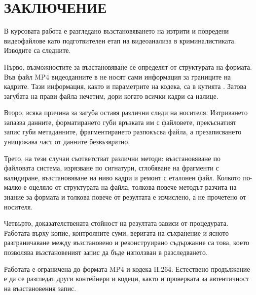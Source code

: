 \section*{ЗАКЛЮЧЕНИЕ}

В курсовата работа е разгледано възстановяването на изтрити и повредени видеофайлове
като подготвителен етап на видеоанализа в криминалистиката. Изводите са следните.

Първо, възможностите за възстановяване се определят от структурата на формата. Във
файл MP4 видеоданните в  не носят сами информация за границите на кадрите. Тази
информация, както и параметрите на кодека, са в кутията . Затова загубата на
 прави файла нечетим, дори когато всички кадри са налице.

Второ, всяка причина за загуба оставя различни следи на носителя. Изтриването запазва
данните, форматирането губи връзката им с файловете, прекъснатият запис губи
метаданните, фрагментирането разпокъсва файла, а презаписването унищожава част от
данните безвъзвратно.

Трето, на тези случаи съответстват различни методи: възстановяване по файловата
система, изрязване по сигнатури, сглобяване на фрагменти с валидиране, възстановяване
на ниво кадри и ремонт с еталонен файл. Колкото по-малко е оцеляло от структурата на
файла, толкова повече методът разчита на знание за формата и толкова повече от
резултата е изчислено, а не прочетено от носителя.

Четвърто, доказателствената стойност на резултата зависи от процедурата. Работата върху
копие, контролните суми, веригата на съхранение и ясното разграничаване между
възстановено и реконструирано съдържание са това, което позволява възстановеният запис
да бъде използван в разследването.

Работата е ограничена до формата MP4 и кодека H.264. Естествено продължение е да се
разгледат други контейнери и кодеци, както и проверката за автентичност на
възстановения запис.
